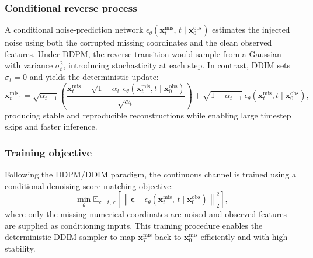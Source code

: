 \documentclass[times, review, 10pt]{elsarticle}
\newcommand{\DIFaddbegin}{\begingroup\color{blue}}
\newcommand{\DIFaddend}{\endgroup}
\begin{document}
\subsubsection{Conditional reverse process}
A conditional noise-prediction network
$
\epsilon_\theta(\mathbf{x}_t^{\mathrm{mis}},\, t \mid \mathbf{x}_0^{\mathrm{obs}})
$
estimates the injected noise using both the corrupted missing coordinates and
the clean observed features. Under DDPM, the reverse transition would sample
from a Gaussian with variance $\sigma_t^2$, introducing stochasticity at each
step. In contrast, DDIM sets $\sigma_t=0$ and yields the deterministic update:
\begin{equation}
\mathbf{x}_{t-1}^{\mathrm{mis}}
=
\sqrt{\alpha_{t-1}}
\!\left(
\frac{\mathbf{x}_t^{\mathrm{mis}}
      - \sqrt{1-\alpha_t}\,
        \epsilon_\theta(\mathbf{x}_t^{\mathrm{mis}},t \mid \mathbf{x}_0^{\mathrm{obs}})}
     {\sqrt{\alpha_t}}
\right)
+
\sqrt{1-\alpha_{t-1}}\,
\epsilon_\theta(\mathbf{x}_t^{\mathrm{mis}},t\mid\mathbf{x}_0^{\mathrm{obs}}),
\end{equation}
producing stable and reproducible reconstructions while enabling large
\DIFaddbegin
timestep skips and faster inference.
\DIFaddend

\subsubsection{Training objective}
Following the DDPM/DDIM paradigm, the continuous channel is trained using a
conditional denoising score-matching objective:
\begin{equation}
\min_\theta
\mathbb{E}_{\mathbf{x}_0,\, t,\, \boldsymbol{\epsilon}}
\left[
\left\|
\boldsymbol{\epsilon}
-
\epsilon_\theta(\mathbf{x}_t^{\mathrm{mis}},\, t \mid \mathbf{x}_0^{\mathrm{obs}})
\right\|_2^2
\right],
\end{equation}
where only the missing numerical coordinates are noised and observed features
are supplied as conditioning inputs. This training procedure enables the
deterministic DDIM sampler to map $\mathbf{x}_T^{\mathrm{mis}}$ back to
$\mathbf{x}_0^{\mathrm{mis}}$ efficiently and with high stability.

\end{document}
